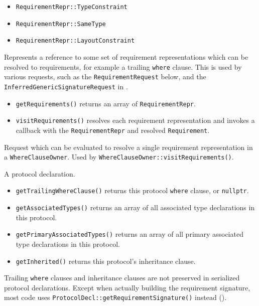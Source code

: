 \documentclass[../generics]{subfiles}
\begin{document}
\begin{itemize}
\item \texttt{RequirementRepr::TypeConstraint}
\item \texttt{RequirementRepr::SameType}
\item \texttt{RequirementRepr::LayoutConstraint}
\end{itemize}

Represents a reference to some set of requirement representations which can be resolved to requirements, for example a trailing \texttt{where} clause. This is used by various requests, such as the \texttt{RequirementRequest} below, and the \texttt{InferredGenericSignatureRequest} in .
\begin{itemize}
\item \texttt{getRequirements()} returns an array of \texttt{RequirementRepr}.
\item \texttt{visitRequirements()} resolves each requirement representation and invokes a callback with the \texttt{RequirementRepr} and resolved \texttt{Requirement}.
\end{itemize}

Request which can be evaluated to resolve a single requirement representation in a \texttt{WhereClauseOwner}. Used by \texttt{WhereClauseOwner::visitRequirements()}.

A protocol declaration.
\begin{itemize}
\item \texttt{getTrailingWhereClause()} returns this protocol \texttt{where} clause, or \texttt{nullptr}.
\item \texttt{getAssociatedTypes()} returns an array of all associated type declarations in this protocol.
\item \texttt{getPrimaryAssociatedTypes()} returns an array of all primary associated type declarations in this protocol.
\item \texttt{getInherited()} returns this protocol's inheritance clause.
\end{itemize}

Trailing \texttt{where} clauses and inheritance clauses are not preserved in serialized protocol declarations. Except when actually building the requirement signature, most code uses \texttt{ProtocolDecl::getRequirementSignature()} instead ().
\end{document}
